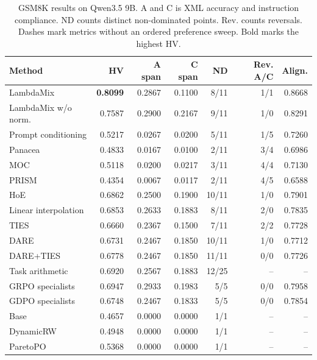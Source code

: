 \begin{table}[htbp]
\centering\small
\setlength{\tabcolsep}{3pt}
\caption{GSM8K results on Qwen3.5 9B. A and C is XML accuracy and instruction compliance. ND counts distinct non-dominated points. Rev. counts reversals. Dashes mark metrics without an ordered preference sweep. Bold marks the highest HV.}
\label{tab:full-gsm8k-q9}
\begin{tabular}{@{}lrrrrrr@{}}
\toprule
Method & HV & A span & C span & ND & Rev. A/C & Align.\\
\midrule
LambdaMix & \textbf{0.8099} & 0.2867 & 0.1100 & 8/11 & 1/1 & 0.8668\\
LambdaMix w/o norm. & 0.7587 & 0.2900 & 0.2167 & 9/11 & 1/0 & 0.8291\\
\midrule
Prompt conditioning & 0.5217 & 0.0267 & 0.0200 & 5/11 & 1/5 & 0.7260\\
Panacea & 0.4833 & 0.0167 & 0.0100 & 2/11 & 3/4 & 0.6986\\
MOC & 0.5118 & 0.0200 & 0.0217 & 3/11 & 4/4 & 0.7130\\
PRISM & 0.4354 & 0.0067 & 0.0117 & 2/11 & 4/5 & 0.6588\\
HoE & 0.6862 & 0.2500 & 0.1900 & 10/11 & 1/0 & 0.7901\\
\midrule
Linear interpolation & 0.6853 & 0.2633 & 0.1883 & 8/11 & 2/0 & 0.7835\\
TIES & 0.6660 & 0.2367 & 0.1500 & 7/11 & 2/2 & 0.7728\\
DARE & 0.6731 & 0.2467 & 0.1850 & 10/11 & 1/0 & 0.7712\\
DARE+TIES & 0.6778 & 0.2467 & 0.1850 & 11/11 & 0/0 & 0.7726\\
Task arithmetic & 0.6920 & 0.2567 & 0.1883 & 12/25 & -- & --\\
\midrule
GRPO specialists & 0.6947 & 0.2933 & 0.1983 & 5/5 & 0/0 & 0.7958\\
GDPO specialists & 0.6748 & 0.2467 & 0.1833 & 5/5 & 0/0 & 0.7854\\
\midrule
Base & 0.4657 & 0.0000 & 0.0000 & 1/1 & -- & --\\
DynamicRW & 0.4948 & 0.0000 & 0.0000 & 1/1 & -- & --\\
ParetoPO & 0.5368 & 0.0000 & 0.0000 & 1/1 & -- & --\\
\bottomrule
\end{tabular}
\end{table}

